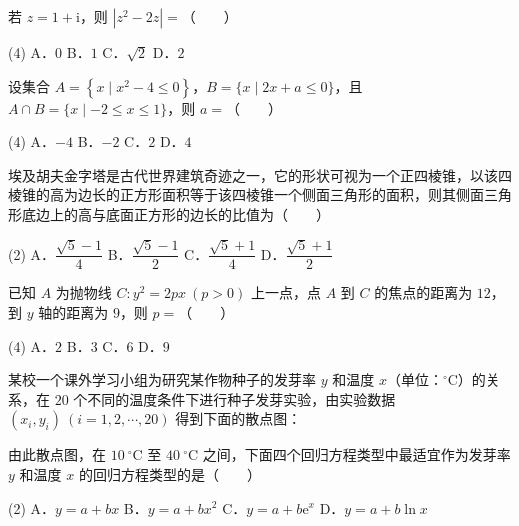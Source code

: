 \begin{question}
若 $z=1+\mathrm i$，则 $\left|z^{2}-2z\right|=$（　　）

\begin{gkopts}(4)
\task A．$0$
\task B．$1$
\task C．$\sqrt2$
\task D．$2$
\end{gkopts}

\end{question}
\begin{question}
设集合 $A=\left\{x\mid x^{2}-4\le0\right\}$，$B=\{x\mid2x+a\le0\}$，且 $A\cap B=\{x\mid-2\le x\le1\}$，则 $a=$（　　）

\begin{gkopts}(4)
\task A．$-4$
\task B．$-2$
\task C．$2$
\task D．$4$
\end{gkopts}

\end{question}
\begin{question}
埃及胡夫金字塔是古代世界建筑奇迹之一，它的形状可视为一个正四棱锥，以该四棱锥的高为边长的正方形面积等于该四棱锥一个侧面三角形的面积，则其侧面三角形底边上的高与底面正方形的边长的比值为（　　）

\begin{gkopts}(2)
\task A．$\dfrac{\sqrt5-1}4$
\task B．$\dfrac{\sqrt5-1}2$
\task C．$\dfrac{\sqrt5+1}4$
\task D．$\dfrac{\sqrt5+1}2$
\end{gkopts}

\end{question}
\begin{question}
已知 $A$ 为抛物线 $C:y^{2}=2px\ (p>0)$ 上一点，点 $A$ 到 $C$ 的焦点的距离为 $12$，到 $y$ 轴的距离为 $9$，则 $p=$（　　）

\begin{gkopts}(4)
\task A．$2$
\task B．$3$
\task C．$6$
\task D．$9$
\end{gkopts}

\Needspace{0.4\textheight}
\end{question}
\begin{question}
某校一个课外学习小组为研究某作物种子的发芽率 $y$ 和温度 $x$（单位：$^\circ\mathrm C$）的关系，在 $20$ 个不同的温度条件下进行种子发芽实验，由实验数据 $\left(x_i,y_i\right)\ (i=1,2,\cdots,20)$ 得到下面的散点图：
\nopagebreak[4]
\begin{center}\end{center}
\nopagebreak[4]
由此散点图，在 $10\ ^\circ\mathrm C$ 至 $40\ ^\circ\mathrm C$ 之间，下面四个回归方程类型中最适宜作为发芽率 $y$ 和温度 $x$ 的回归方程类型的是（　　）

\begin{gkopts}(2)
\task A．$y=a+bx$
\task B．$y=a+bx^{2}$
\task C．$y=a+b\mathrm e^{x}$
\task D．$y=a+b\ln x$
\end{gkopts}

\end{question}
